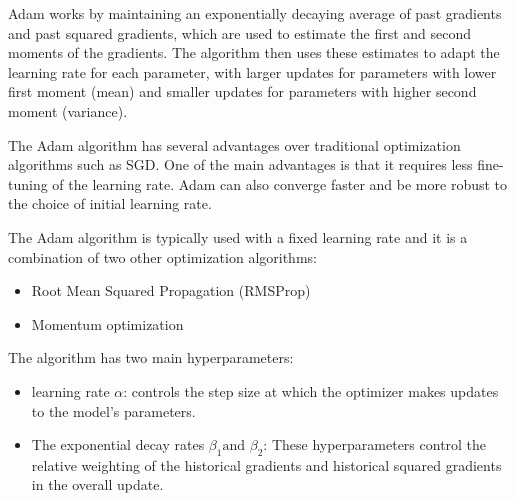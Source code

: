 \documentclass[a4paper]{article}
\begin{document}
Adam works by maintaining an exponentially decaying average of past gradients and past squared gradients, which are used to estimate the first and second moments of the gradients. The algorithm then uses these estimates to adapt the learning rate for each parameter, with larger updates for parameters with lower first moment (mean) and smaller updates for parameters with higher second moment (variance).

The Adam algorithm has several advantages over traditional optimization algorithms such as SGD. One of the main advantages is that it requires less fine-tuning of the learning rate. Adam can also converge faster and be more robust to the choice of initial learning rate.

The Adam algorithm is typically used with a fixed learning rate and it is a combination of two other optimization algorithms:

\begin{itemize}[leftmargin=7.5pt]
    \item Root Mean Squared Propagation (RMSProp)
    \item Momentum optimization
\end{itemize}

The algorithm has two main hyperparameters:
\begin{itemize}[leftmargin=7.5pt]
    \item learning rate $\alpha$: controls the step size at which the optimizer makes updates to the model's parameters.
    \item The exponential decay rates $\beta_1 \text{and } \beta_2$: These hyperparameters control the relative weighting of the historical gradients and historical squared gradients in the overall update.
\end{itemize}
\end{document}
